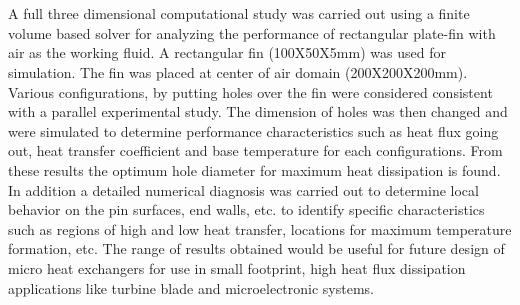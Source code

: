 %
%
%




%   
%

%
%
%
%



\chapter*{}

A full three dimensional computational study was carried out using a finite volume based solver for analyzing the performance of rectangular plate-fin with air as the working fluid. A rectangular fin (100X50X5mm) was used for simulation. The fin was placed at center of air domain (200X200X200mm). Various configurations, by putting holes over the fin were considered consistent with a parallel experimental study. The dimension of holes was then changed and were simulated to determine performance characteristics such as heat flux going out, heat transfer coefficient and base temperature for each configurations. From these results the optimum hole diameter for maximum heat dissipation is found. In addition a detailed numerical diagnosis was carried out to determine local behavior on the pin surfaces, end walls, etc. to identify specific characteristics such as regions of high and low heat transfer, locations for maximum temperature formation, etc. The range of results obtained would be useful for future design of micro heat exchangers for use in small footprint, high heat flux dissipation applications like turbine blade and microelectronic systems. 


